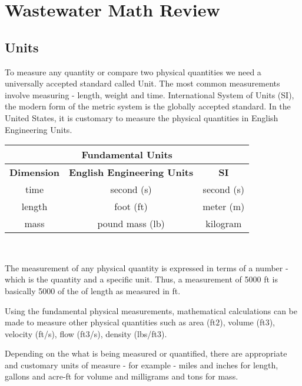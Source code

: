 

\chapter{Wastewater Math Review}

\section{Units}

To measure any quantity or compare two physical quantities we need a universally accepted standard called Unit. The most common measurements involve measuring - length, weight and time.   International System of Units (SI), the modern form of the metric system is the globally accepted standard.  In the United States, it is customary to measure the physical quantities in English Engineering Units.\\
\vspace{0.5cm}
\begin{tabular}{c c c }
\hline
\multicolumn{3}{c}{\textbf{Fundamental Units}} \\
\hline
\textbf{Dimension} & \textbf{English Engineering Units} & \textbf{SI}\\
\hline
time & second (s) & second (s) \\
length & foot (ft) & meter (m)\\
mass & pound mass (lb) & kilogram\\
\end{tabular}\\

\vspace{0.5cm}

The measurement of any physical quantity is expressed in terms of a number - which is the quantity and a specific unit.  
Thus, a measurement of 5000 ft is basically 5000 of the of length as measured in ft.

Using the fundamental physical measurements, mathematical calculations can be made to measure other physical quantities such as area (ft$2$), volume (ft$3$), velocity (ft/s), flow (ft$3$/s), density (lbs/ft$3$).

Depending on the what is being measured or quantified, there are appropriate and customary units of measure - for example - miles and inches for length, gallons and acre-ft for volume and milligrams and tons for mass.
